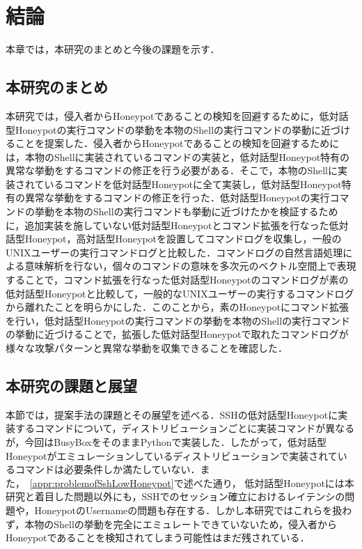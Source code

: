 \chapter{結論}
\label{conc}

本章では，本研究のまとめと今後の課題を示す．

\section{本研究のまとめ}

本研究では，侵入者からHoneypotであることの検知を回避するために，低対話型Honeypotの実行コマンドの挙動を本物のShellの実行コマンドの挙動に近づけることを提案した．侵入者からHoneypotであることの検知を回避するためには，本物のShellに実装されているコマンドの実装と，低対話型Honeypot特有の異常な挙動をするコマンドの修正を行う必要がある．そこで，本物のShellに実装されているコマンドを低対話型Honeypotに全て実装し，低対話型Honeypot特有の異常な挙動をするコマンドの修正を行った．低対話型Honeypotの実行コマンドの挙動を本物のShellの実行コマンドも挙動に近づけたかを検証するために，追加実装を施していない低対話型Honeypotとコマンド拡張を行なった低対話型Honeypot，高対話型Honeypotを設置してコマンドログを収集し，一般のUNIXユーザーの実行コマンドログと比較した．コマンドログの自然言語処理による意味解析を行ない，個々のコマンドの意味を多次元のベクトル空間上で表現することで，コマンド拡張を行なった低対話型Honeypotのコマンドログが素の低対話型Honeypotと比較して，一般的なUNIXユーザーの実行するコマンドログから離れたことを明らかにした．このことから，素のHoneypotにコマンド拡張を行い，低対話型Honeypotの実行コマンドの挙動を本物のShellの実行コマンドの挙動に近づけることで，拡張した低対話型Honeypotで取れたコマンドログが様々な攻撃パターンと異常な挙動を収集できることを確認した．

\section{本研究の課題と展望}
本節では，提案手法の課題とその展望を述べる．SSHの低対話型Honeypotに実装するコマンドについて，ディストリビューションごとに実装コマンドが異なるが，今回はBusyBoxをそのままPythonで実装した．したがって，低対話型Honeypotがエミュレーションしているディストリビューションで実装されているコマンドは必要条件しか満たしていない．また，~\ref{appr:problemofSshLowHoneypot}で述べた通り，
低対話型Honeypotには本研究と着目した問題以外にも，SSHでのセッション確立におけるレイテンシの問題や，HoneypotのUsernameの問題も存在する．しかし本研究ではこれらを扱わず，本物のShellの挙動を完全にエミュレートできていないため，侵入者からHoneypotであることを検知されてしまう可能性はまだ残されている．


